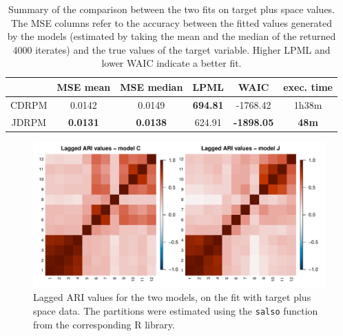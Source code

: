 \documentclass[12pt,	%
	a4paper,		%
	twoside,		%
	openright,		%
	titlepage,%
	]{book}
\theoremstyle{definition}
\newcommand{\mjline}[1]{\texttt{#1}}
\begin{document}
\begin{table}[!ht]
    \caption[Accuracy metrics of CDRPM and JDRPM fits, target plus space values]{Summary of the comparison between the two fits on target plus space values. The MSE columns refer to the accuracy between the fitted values generated by the models (estimated by taking the mean and the median of the returned 4000 iterates) and the true values of the target variable. Higher LPML and lower WAIC indicate a better fit.}
    \centering
    \begin{tabular}{cccccc}
    \toprule
           & MSE mean &  MSE median & LPML & WAIC & exec. time  \\
           \midrule
        CDRPM &   0.0142   & 0.0149   & \textbf{ 694.81} & -1768.42 & 1h38m\\
        JDRPM & \textbf{0.0131}  & \textbf{0.0138}   & 624.91 & \textbf{-1898.05}  &  \textbf{48m}\\
        \bottomrule
    \end{tabular}
    \label{tab: fits metrics space}
\end{table}


\begin{figure}[!ht]
    \centering
    \includegraphics[width=1\linewidth]{Testing/Assessing correctness/space/ari.pdf}
    \caption[Lagged ARI values of CDRPM and JDRPM fits, target plus space values]{Lagged ARI values for the two models, on the fit with target plus space data. The partitions were estimated using the \mjline{salso} function from the corresponding R library.}
    \label{fig:ari space}
\end{figure}
\end{document}
